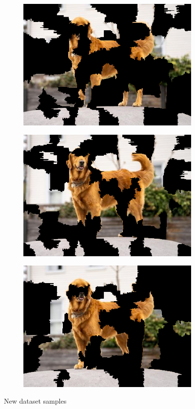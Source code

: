 \begin{figure}
    \captionsetup{justification=centering}

    \begin{subfigure}[t]{0.31\textwidth}
        \captionsetup{justification=centering}
        \centering
        \includegraphics[width=.7\linewidth]{figuras/lime/superpixel_sample0.png}
    \end{subfigure}
    \hfill
    \begin{subfigure}[t]{0.31\textwidth}
        \captionsetup{justification=centering}
        \centering
        \includegraphics[width=.7\linewidth]{figuras/lime/superpixel_sample1.png}
    \end{subfigure}
    \hfill
    \begin{subfigure}[t]{0.31\textwidth}
        \captionsetup{justification=centering}
        \centering
        \includegraphics[width=.7\linewidth]{figuras/lime/superpixel_sample2.png}
    \end{subfigure}
    \caption{New dataset samples}
    \label{fig:superpixel_samples}
\end{figure}

